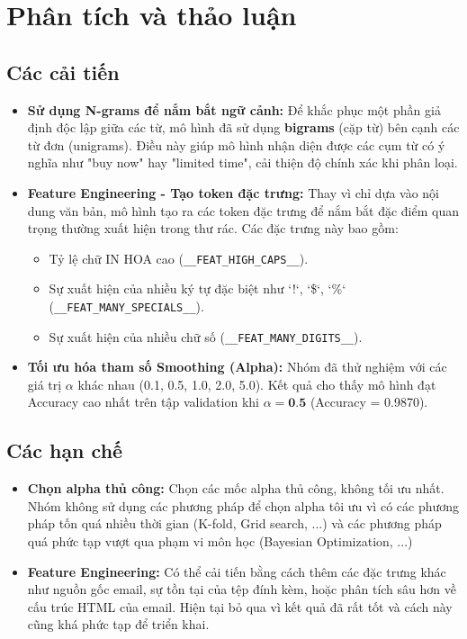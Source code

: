 \section{Phân tích và thảo luận}

\subsection{Các cải tiến}
\begin{itemize}
    \item \textbf{Sử dụng N-grams để nắm bắt ngữ cảnh:} Để khắc phục một phần giả định độc lập giữa các từ, mô hình đã sử dụng \textbf{bigrams} (cặp từ) bên cạnh các từ đơn (unigrams). Điều này giúp mô hình nhận diện được các cụm từ có ý nghĩa như "buy now" hay "limited time", cải thiện độ chính xác khi phân loại.

    \item \textbf{Feature Engineering - Tạo token đặc trưng:} Thay vì chỉ dựa vào nội dung văn bản, mô hình tạo ra các token đặc trưng để nắm bắt đặc điểm quan trọng thường xuất hiện trong thư rác. Các đặc trưng này bao gồm:
    \begin{itemize}
        \item Tỷ lệ chữ IN HOA cao (\texttt{\_\_FEAT\_HIGH\_CAPS\_\_}).
        \item Sự xuất hiện của nhiều ký tự đặc biệt như `!`, `\$`, `\%` (\texttt{\_\_FEAT\_MANY\_SPECIALS\_\_}).
        \item Sự xuất hiện của nhiều chữ số (\texttt{\_\_FEAT\_MANY\_DIGITS\_\_}).
    \end{itemize}
    \item \textbf{Tối ưu hóa tham số Smoothing (Alpha):} Nhóm đã thử nghiệm với các giá trị $\alpha$ khác nhau (0.1, 0.5, 1.0, 2.0, 5.0). Kết quả cho thấy mô hình đạt Accuracy cao nhất trên tập validation khi $\alpha = \textbf{0.5}$ (Accuracy = 0.9870).
\end{itemize}

\subsection{Các hạn chế}
\begin{itemize}
    \item \textbf{Chọn alpha thủ công:} Chọn các mốc alpha thủ công, không tối ưu nhất. Nhóm không sử dụng các phương pháp để chọn alpha tôi ưu vì có các phương pháp tốn quá nhiều thời gian (K-fold, Grid search, ...) và các phương pháp quá phức tạp vượt qua phạm vi môn học (Bayesian Optimization, ...)
    \item \textbf{Feature Engineering:} Có thể cải tiến bằng cách thêm các đặc trưng khác như nguồn gốc email, sự tồn tại của tệp đính kèm, hoặc phân tích sâu hơn về cấu trúc HTML của email. Hiện tại bỏ qua vì kết quả đã rất tốt và cách này cũng khá phức tạp để triển khai.
\end{itemize}

